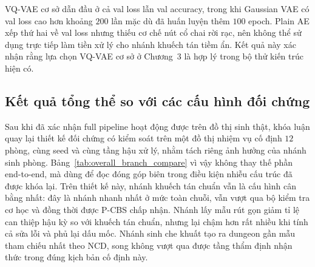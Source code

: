 \documentclass[oneside,a4paper,12pt]{extreport}
\begin{document}
\begin{table}[H]
\centering
\small
\setlength{\tabcolsep}{4pt}
\renewcommand{\arraystretch}{1.08}
\caption{So sánh kiến trúc tokenizer: VQ-VAE, Gaussian VAE và Plain AE}
\label{tab:tokenizer_architecture_compare}
\end{table}

VQ-VAE cơ sở dẫn đầu ở cả val loss lẫn val accuracy, trong khi Gaussian VAE có val loss cao hơn khoảng $200$ lần mặc dù đã huấn luyện thêm $100$ epoch. Plain AE xếp thứ hai về val loss nhưng thiếu cơ chế nút cổ chai rời rạc, nên không thể sử dụng trực tiếp làm tiền xử lý cho nhánh khuếch tán tiềm ẩn. Kết quả này xác nhận rằng lựa chọn VQ-VAE cơ sở ở Chương~3 là hợp lý trong bộ thử kiến trúc hiện có.

\subsection{Kết quả tổng thể so với các cấu hình đối chứng}
Sau khi đã xác nhận full pipeline hoạt động được trên đồ thị sinh thật, khóa luận quay lại thiết kế đối chứng có kiểm soát trên một đồ thị nhiệm vụ cố định $12$ phòng, cùng seed và cùng tầng hậu xử lý, nhằm tách riêng ảnh hưởng của nhánh sinh phòng. Bảng~\ref{tab:overall_branch_compare} vì vậy không thay thế phần end-to-end, mà dùng để đọc đóng góp biên trong điều kiện nhiễu cấu trúc đã được khóa lại. Trên thiết kế này, nhánh khuếch tán chuẩn vẫn là cấu hình cân bằng nhất: đây là nhánh nhanh nhất ở mức toàn chuỗi, vẫn vượt qua bộ kiểm tra cơ học và đồng thời được P-CBS chấp nhận. Nhánh lấy mẫu rút gọn giảm tỉ lệ can thiệp hậu kỳ so với khuếch tán chuẩn, nhưng lại chậm hơn rất nhiều khi tính cả sửa lỗi và phủ lại dấu mốc. Nhánh sinh che khuất tạo ra dungeon gần mẫu tham chiếu nhất theo NCD, song không vượt qua được tầng thẩm định nhận thức trong đúng kịch bản cố định này.
\end{document}
